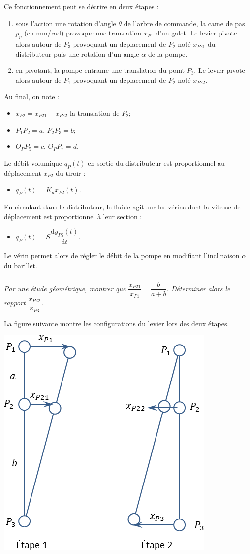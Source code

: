 \documentclass[10pt,fleqn]{article} %
\begin{document}
\begin{multicols}{2}
Ce fonctionnement peut se décrire en deux étapes : 
\begin{enumerate}
\item sous l'action une rotation d'angle $\theta$ de l'arbre de commande, la came de pas $p_p$ (en mm/rad) provoque une translation $x_{P1}$ d'un galet. Le levier pivote alors autour de $P_3$ provoquant un déplacement de $P_2$ noté $x_{P21}$ du distributeur puis une rotation d'un angle $\alpha$ de la pompe.
\item en pivotant, la pompe entraine une translation du point $P_3$. Le levier pivote alors autour de $P_1$ provoquant un déplacement de $P_2$ noté $x_{P22}$.
\end{enumerate}
Au final, on note :
\begin{itemize}
\item $x_{P2}=x_{P21}-x_{P22}$ la translation de $P_2$;
\item $P_1P_2 = a$, $P_2P_3 = b$;
\item $O_PP_5 = c$, $O_PP_7 = d$.
\end{itemize}

Le débit volumique $q_P(t)$ en sortie du distributeur est proportionnel au déplacement $x_{P2}$ du tiroir : 
\begin{itemize}
\item $q_P(t)=K_d x_{P2}(t)$.
\end{itemize}

En circulant dans le distributeur, le fluide agit sur les vérins dont la vitesse de déplacement est proportionnel à leur section : 
\begin{itemize}
\item $q_{P}(t)= S \dfrac{\text{d}y_{P5}(t)}{\text{d}t}$.
\end{itemize}


Le vérin permet alors de régler le débit de la pompe en modifiant l'inclinaison $\alpha$ du barillet.


\subparagraph{}
\textit{Par une étude géométrique, montrer que $\dfrac{x_{P21}}{x_{P1}}=\dfrac{b}{a+b}$. Déterminer alors le rapport $\dfrac{x_{P22}}{x_{P3}}$.}
\ifprof 
\begin{corrige}
La figure suivante montre les configurations du levier lors des deux étapes.

\begin{center}
\includegraphics[width=.49\textwidth]{images/Levier}
\end{center}


\end{corrige}
\end{multicols}
\end{document}
